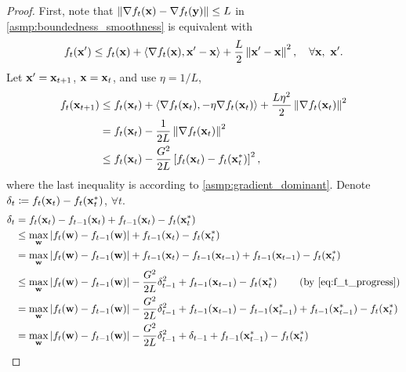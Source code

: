 \begin{proof}
First, note that $\left\| \nabla f_t({\mathbf{x}} ) - \nabla f_t({\mathbf{y}}) \right\| \le L $ in \cref{asmp:boundedness_smoothness} is equivalent with
\begin{equation*}
\begin{split}
    f_t({\mathbf{x}}^\prime) \le f_t({\mathbf{x}}) + \left\langle \nabla f_t({\mathbf{x}}) , {\mathbf{x}}^\prime - {\mathbf{x}} \right\rangle +  \frac{L}{2} \left\| {\mathbf{x}}^\prime - {\mathbf{x}} \right\|^2, \quad \forall {\mathbf{x}}, \ {\mathbf{x}}^\prime.
\end{split}
\end{equation*}
Let ${\mathbf{x}}^\prime = {\mathbf{x}}_{t+1}$, ${\mathbf{x}} = {\mathbf{x}}_{t}$, and use $\eta = 1/L$,
\begin{equation}
\label{eq:f_t_progress}
\begin{split}
    f_t({\mathbf{x}}_{t+1}) &\le f_t({\mathbf{x}}_{t}) + \left\langle \nabla f_t({\mathbf{x}}_t) , - \eta \nabla f_t({\mathbf{x}}_t) \right\rangle +  \frac{L \eta^2}{2} \left\| \nabla f_t({\mathbf{x}}_t) \right\|^2 \\
    &= f_t({\mathbf{x}}_{t}) - \frac{1}{2 L} \left\| \nabla f_t({\mathbf{x}}_t) \right\|^2 \\
    &\le f_t({\mathbf{x}}_{t}) - \frac{G^2}{2 L} \left[ f_t({\mathbf{x}}_t) - f_t({\mathbf{x}}_t^*) \right]^2,
\end{split}
\end{equation}
where the last inequality is according to \cref{asmp:gradient_dominant}. Denote $\delta_t \coloneqq f_t({\mathbf{x}}_t) - f_t( {\mathbf{x}}_t^* )$, $\forall t$.
\begin{equation*}
\begin{split}
    \delta_t &= f_t(\rvx_t) - f_{t-1}(\rvx_t) + f_{t-1}(\rvx_t) - f_t( \rvx_t^* ) \\
    &\le \max\limits_{\rvw}{\left| f_{t}(\rvw) - f_{t-1}(\rvw) \right| } + f_{t-1}(\rvx_t) - f_t( \rvx_t^* ) \\
    &= \max\limits_{\rvw}{\left| f_{t}(\rvw) - f_{t-1}(\rvw) \right| } + f_{t-1}(\rvx_t) - f_{t-1}(\rvx_{t-1}) + f_{t-1}(\rvx_{t-1}) - f_t( \rvx_t^* ) \\
    &\le \max\limits_{\rvw}{\left| f_{t}(\rvw) - f_{t-1}(\rvw) \right| } - \frac{G^2}{2L} \delta_{t-1}^2 + f_{t-1}(\rvx_{t-1}) - f_t( \rvx_t^*) \qquad \left( \text{by \cref{eq:f_t_progress}} \right) \\
    &=  \max\limits_{\rvw}{\left| f_{t}(\rvw) - f_{t-1}(\rvw) \right| } - \frac{G^2}{2L} \delta_{t-1}^2 + f_{t-1}(\rvx_{t-1}) - f_{t-1}(\rvx_{t-1}^*) + f_{t-1}(\rvx_{t-1}^*) - f_t( \rvx_t^* ) \\
    &= \max\limits_{\rvw}{\left| f_{t}(\rvw) - f_{t-1}(\rvw) \right| } - \frac{G^2}{2L} \delta_{t-1}^2 + \delta_{t-1} + f_{t-1}(\rvx_{t-1}^*) - f_t( \rvx_t^*) \\

\end{split}
\end{equation*}
\end{proof}
